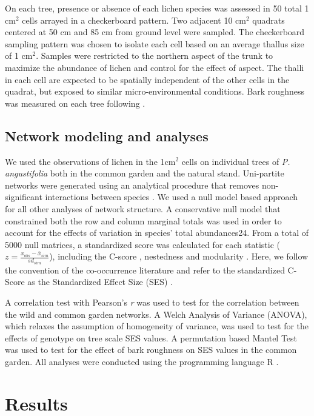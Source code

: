 \documentclass[fleqn,10pt]{wlscirep}
\begin{document}
On each tree, presence or absence of each lichen species was assessed
in 50 total 1 cm$^2$ cells arrayed in a checkerboard pattern. Two
adjacent 10 cm$^2$ quadrats centered at 50 cm and 85 cm from ground
level were sampled. The checkerboard sampling pattern was chosen to
isolate each cell based on an average thallus size of 1
cm$^2$. Samples were restricted to the northern aspect of the trunk to
maximize the abundance of lichen and control for the effect of
aspect. The thalli in each cell are expected to be spatially
independent of the other cells in the quadrat, but exposed to similar
micro-environmental conditions. Bark roughness was measured on each
tree following \cite{Winfree2011}.

\subsection*{Network modeling and analyses}

We used the observations of lichen in the 1cm$^2$ cells on individual
trees of \textit{P. angustifolia} both in the common garden and the
natural stand. Uni-partite networks were generated using an analytical
procedure that removes non-significant interactions between species
\cite{Araujo2011}. We used a null model based approach for all other
analyses of network structure. A conservative null model that
constrained both the row and column marginal totals was used in order
to account for the effects of variation in species’ total
abundances24. From a total of 5000 null matrices, a standardized score
was calculated for each statistic ($z = \frac{x_{obs} -
  \bar{x}_{sim}}{sd_{sim}}$), including the C-score \cite{Stone1990a},
nestedness \cite{Atmar1993} and modularity \cite{Newman2006}. Here, we
follow the convention of the co-occurrence literature and refer to the
standardized C-Score as the Standardized Effect Size (SES)
\cite{Gotelli2001}.

A correlation test with Pearson’s \textit{r} was used to test for the
correlation between the wild and common garden networks. A Welch
Analysis of Variance (ANOVA), which relaxes the assumption of
homogeneity of variance, was used to test for the effects of genotype
on tree scale SES values. A permutation based Mantel Test was used to
test for the effect of bark roughness on SES values in the common
garden. All analyses were conducted using the programming language R
\cite{RCoreTeam2017}.



\section*{Results}
\end{document}
